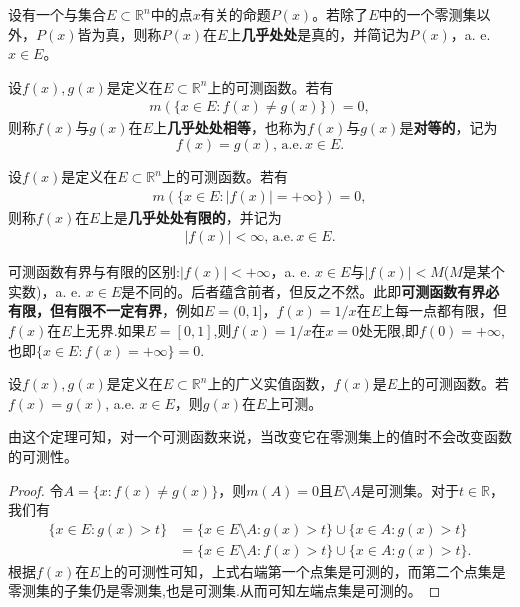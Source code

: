 \documentclass[../../main.tex]{subfiles}
\begin{document}
\begin{definition}
设有一个与集合$E \subset \mathbb{R}^n$中的点$x$有关的命题$P(x)$。若除了$E$中的一个零测集以外，$P(x)$皆为真，则称$P(x)$在$E$上\textbf{几乎处处}是真的，并简记为$P(x)$，a. e.$ x\in E$。
\end{definition}

\begin{definition}
设$f(x), g(x)$是定义在$E \subset \mathbb{R}^n$上的可测函数。若有
\begin{align*}
m(\{x \in E: f(x) \neq g(x)\}) = 0,
\end{align*}
则称$f(x)$与$g(x)$在$E$上\textbf{几乎处处相等}，也称为$f(x)$与$g(x)$是\textbf{对等的}，记为$$f(x) = g(x),\,\mathrm{a}.\mathrm{e}.\,x \in E.$$

设$f(x)$是定义在$E \subset \mathbb{R}^n$上的可测函数。若有
\begin{align*}
m(\{x \in E: |f(x)| = +\infty\}) = 0,
\end{align*}
则称$f(x)$在$E$上是\textbf{几乎处处有限的}，并记为
\begin{align*}
|f(x)| < \infty,\,\mathrm{a}.\mathrm{e}.\,x \in E.
\end{align*}
\end{definition}
\begin{remark}
可测函数有界与有限的区别:$|f(x)| < +\infty$，a. e. $x \in E$与$|f(x)| < M$($M$是某个实数)，a. e. $x \in E$是不同的。后者蕴含前者，但反之不然。此即\textbf{可测函数有界必有限，但有限不一定有界}，例如\(E = (0, 1]\)，\(f(x) = 1/x\)在\(E\)上每一点都有限，但\(f(x)\)在\(E\)上无界.如果$E=[0,1]$,则\(f(x) = 1/x\)在$x=0$处无限,即$f(0)=+\infty$,也即$\{x\in E:f(x)=+\infty\}={0}.$
\end{remark}

\begin{theorem}
设$f(x),g(x)$是定义在$E \subset \mathbb{R}^n$上的广义实值函数，$f(x)$是$E$上的可测函数。若$f(x) = g(x)$, a.e. $x \in E$，则$g(x)$在$E$上可测。
\end{theorem}
\begin{remark}
由这个定理可知，对一个可测函数来说，当改变它在零测集上的值时不会改变函数的可测性。 
\end{remark}
\begin{proof}
令$A = \{x: f(x) \neq g(x)\}$，则$m(A) = 0$且$E \setminus A$是可测集。对于$t \in \mathbb{R}$，我们有
\begin{align*}
\{x \in E: g(x) > t\} 
&= \{x \in E \setminus A: g(x) > t\} \cup \{x \in A: g(x) > t\} \\
&= \{x \in E \setminus A: f(x) > t\} \cup \{x \in A: g(x) > t\}.
\end{align*}
根据$f(x)$在$E$上的可测性可知，上式右端第一个点集是可测的，而第二个点集是零测集的子集仍是零测集,也是可测集.从而可知左端点集是可测的。
\end{proof}
\end{document}
